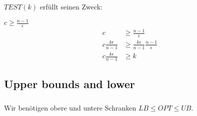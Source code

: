 \documentclass{beamer}
\begin{document}
\begin{frame}
   \frametitle{\insertsection}
   \framesubtitle{\insertsubsection}

   $TEST(k)$ erfüllt seinen Zweck:
   \begin{block}{$c\geq\frac{n-1}{\epsilon}$}
      \normalsize
      \begin{align*}
         c & \ge \frac{n-1}{\epsilon} \\
         c \frac{k\epsilon}{n-1} & \ge \frac{k\epsilon}{n-1}\frac{n-1}{\epsilon} \\
         c \frac{k\epsilon}{n-1} & \ge k
      \end{align*}
   \end{block}
\end{frame}

\begin{frame}
   \frametitle{\insertsection}
   \framesubtitle{\insertsubsection}
\end{frame}

\subsection{Upper bounds and lower}

\begin{frame}
   \frametitle{\insertsection}
   \framesubtitle{\insertsubsection}
   Wir benötigen obere und untere Schranken $LB \le OPT \le UB$.
  
\end{frame}
\end{document}
